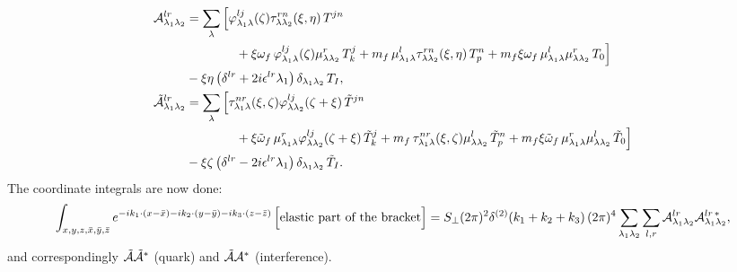 \documentclass[9pt]{article}
\numberwithin{equation}{section}
\begin{document}
\begin{align}\label{eq:Ael}
\mathcal{A}^{lr}_{\lambda_{1}\lambda_{2}} & = \sum_{\lambda}\Big[\varphi^{lj}_{\lambda_{1}\lambda}(\zeta)\tau^{rn}_{\lambda\lambda_{2}}(\xi,\eta)\,T^{jn}\notag \\ & \hspace{4em}+\xi\omega_{f}\,\varphi^{lj}_{\lambda_{1}\lambda}(\zeta)\mu^{r}_{\lambda\lambda_{2}}\,T^{j}_{k}+m_{f}\,\mu^{l}_{\lambda_{1}\lambda}\tau^{rn}_{\lambda\lambda_{2}}(\xi,\eta)\,T^{n}_{p}+m_{f}\xi\omega_{f}\,\mu^{l}_{\lambda_{1}\lambda}\mu^{r}_{\lambda\lambda_{2}}\,T_{0}\Big]\notag \\ & -\xi\eta\left(\delta^{lr}+2i\epsilon^{lr}\lambda_{1}\right)\delta_{\lambda_{1}\lambda_{2}}\,T_{I},\notag \\
\Tilde{\mathcal{A}}^{lr}_{\lambda_{1}\lambda_{2}} & = \sum_{\lambda}\Big[\tau^{nr}_{\lambda_{1}\lambda}(\xi,\zeta)\varphi^{lj}_{\lambda\lambda_{2}}(\zeta+\xi)\,\Tilde{T}^{jn}\notag \\ & \hspace{4em}+\xi\Tilde{\omega}_{f}\,\mu^{r}_{\lambda_{1}\lambda}\varphi^{lj}_{\lambda\lambda_{2}}(\zeta+\xi)\,\Tilde{T}^{j}_{k}+m_{f}\,\tau^{nr}_{\lambda_{1}\lambda}(\xi,\zeta)\mu^{l}_{\lambda\lambda_{2}}\,\Tilde{T}^{n}_{p}+m_{f}\xi\Tilde{\omega}_{f}\,\mu^{r}_{\lambda_{1}\lambda}\mu^{l}_{\lambda\lambda_{2}}\,\Tilde{T}_{0}\Big]\notag \\ & -\xi\zeta\left(\delta^{lr}-2i\epsilon^{lr}\lambda_{1}\right)\delta_{\lambda_{1}\lambda_{2}}\,\Tilde{T}_{I}.
\end{align}
The coordinate integrals are now done:
\begin{align}
\int_{x,y,z,\Bar{x},\Bar{y},\Bar{z}}e^{-ik_{1}\cdot(x-\Bar{x})-ik_{2}\cdot(y-\Bar{y})-ik_{3}\cdot(z-\Bar{z})}\,\Big[\text{elastic part of the bracket}\Big] = S_{\perp}(2\pi)^{2}\delta^{(2)}(k_{1}+k_{2}+k_{3})\,(2\pi)^{4}\sum_{\lambda_{1}\lambda_{2}}\sum_{l,r}\mathcal{A}^{lr}_{\lambda_{1}\lambda_{2}}\mathcal{A}^{lr\,*}_{\lambda_{1}\lambda_{2}},
\end{align}
and correspondingly $\Tilde{\mathcal{A}}\Tilde{\mathcal{A}}^{*}$ (quark) and $\Tilde{\mathcal{A}}\mathcal{A}^{*}$ (interference).
\end{document}

